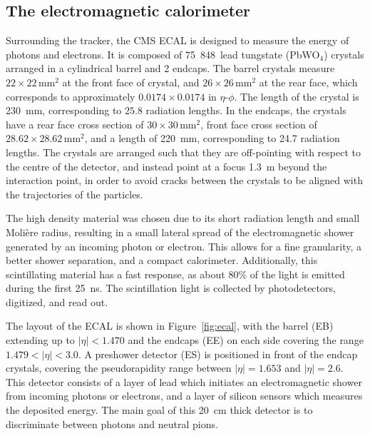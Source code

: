 \subsection{The electromagnetic calorimeter}

Surrounding the tracker, the \ac{CMS} \acf{ECAL} is designed to measure the energy of photons and electrons. It is composed of 75~848~lead tungstate (PbWO$_4$) crystals arranged in a cylindrical barrel and 2 endcaps. The barrel crystals measure $22\times22\, \mathrm{mm}^2$ at the front face of crystal, and $26\times26\, \mathrm{mm}^2$ at the rear face, which corresponds to approximately $0.0174\times0.0174$ in $\eta$-$\phi$. The length of the crystal is \SI{230}{mm}, corresponding to $25.8$ radiation lengths. In the endcaps, the crystals have a rear face cross section of $30\times30\, \mathrm{mm}^2$, front face cross section of $28.62\times28.62\, \mathrm{mm}^2$, and a length of \SI{220}{mm}, corresponding to 24.7 radiation lengths. The crystals are arranged such that they are off-pointing with respect to the centre of the detector, and instead point at a focus \SI{1.3}{m} beyond the interaction point, in order to avoid cracks between the crystals to be aligned with the trajectories of the particles.

The high density material was chosen due to its short radiation length and small Moli\`ere radius, resulting in a small lateral spread of the electromagnetic shower generated by an incoming photon or electron. This allows for a fine granularity, a better shower separation, and a compact calorimeter. Additionally, this scintillating material has a fast response, as about 80\% of the light is emitted during the first \SI{25}{ns}. The scintillation light is collected by photodetectors, digitized, and read out.

The layout of the \ac{ECAL} is shown in Figure~\ref{fig:ecal}, with the barrel (EB) extending up to $|\eta| < 1.470$ and the endcaps (EE) on each side covering the range $1.479 < |\eta| < 3.0$. A preshower detector (ES) is positioned in front of the endcap crystals, covering the pseudorapidity range between $|\eta|=1.653$ and $|\eta| = 2.6$. This detector consists of a layer of lead which initiates an electromagnetic shower from incoming photons or electrons, and a layer of silicon sensors which measures the deposited energy. The main goal of this 20~cm thick detector is to discriminate between photons and neutral pions.


